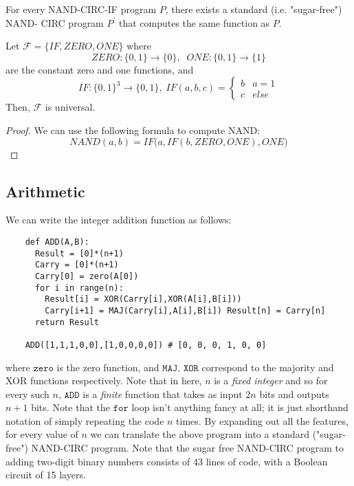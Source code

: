   \begin{theorem}
    For every NAND-CIRC-IF program $P$, there exists a standard (i.e. "sugar-free") NAND- CIRC program $P^\prime$ that computes the same function as $P$. 
  \end{theorem}

  \begin{theorem}
    Let $\mathcal{F} = \{IF, ZERO, ONE\}$ where 
    \begin{equation}
      ZERO: \{0,1\} \longrightarrow \{0\}, \;\; ONE: \{0,1\} \longrightarrow \{1\}
    \end{equation}
    are the constant zero and one functions, and 
    \begin{equation}
      IF: \{0,1\}^3 \longrightarrow \{0,1\}, \; IF (a, b, c) = \begin{cases}
        b & a = 1 \\
        c & else 
      \end{cases}
    \end{equation}
    Then, $\mathcal{F}$ is universal. 
  \end{theorem}
  \begin{proof}
    We can use the following formula to compute NAND: 
    \begin{equation}
      NAND(a, b) = IF\big( a, IF(b, ZERO, ONE), ONE\big)
    \end{equation}
  \end{proof}

\subsection{Arithmetic}

  We can write the integer addition function as follows: 

  \begin{lstlisting}
    def ADD(A,B):
      Result = [0]*(n+1) 
      Carry = [0]*(n+1) 
      Carry[0] = zero(A[0]) 
      for i in range(n):
        Result[i] = XOR(Carry[i],XOR(A[i],B[i]))
        Carry[i+1] = MAJ(Carry[i],A[i],B[i]) Result[n] = Carry[n]
      return Result
        
    ADD([1,1,1,0,0],[1,0,0,0,0]) # [0, 0, 0, 1, 0, 0]
  \end{lstlisting}

  where $\texttt{zero}$ is the zero function, and $\texttt{MAJ, XOR}$ correspond to the majority and XOR functions respectively. Note that in here, $n$ is a \textit{fixed integer} and so for every such $n$, $\texttt{ADD}$ is a \textit{finite} function that takes as input $2n$ bits and outputs $n+1$ bits. Note that the $\texttt{for}$ loop isn't anything fancy at all; it is just shorthand notation of simply repeating the code $n$ times. By expanding out all the features, for every value of $n$ we can translate the above program into a standard ("sugar-free") NAND-CIRC program. Note that the sugar free NAND-CIRC program to adding two-digit binary numbers consists of 43 lines of code, with a Boolean circuit of 15 layers. 


